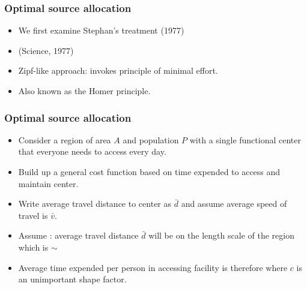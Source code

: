 \begin{frame}
  \frametitle{Optimal source allocation}

    \begin{itemize}
    \item<+-> 
      We first examine Stephan's treatment (1977)\cite{stephan1977a,stephan1984a}
    \item<+->
       (Science, 1977)
    \item<+->
      Zipf-like approach: invokes \alert{principle of minimal effort}.
    \item<+->
      Also known as the Homer principle.
    \end{itemize}

\end{frame}

\begin{frame}
  \frametitle{Optimal source allocation}

  \begin{itemize}
  \item<1-> 
    Consider a region of area $A$ and population $P$ with
    a single functional center that everyone needs to access
    every day.
  \item<2->
    Build up a general cost function based on time expended
    to \alert{access and maintain center}.
  \item<3->
    Write \alert{average travel distance} to center as $\bar{d}$ and 
    assume \alert{average speed of travel} is $\bar{v}$.
  \item<4->
    Assume : average travel distance $\bar{d}$ will be on the length
    scale of the region which is $\sim$ 
  \item<5->
    Average time expended per person in accessing facility
    is therefore
    where $c$ is an unimportant shape factor.
  \end{itemize}

\end{frame}

